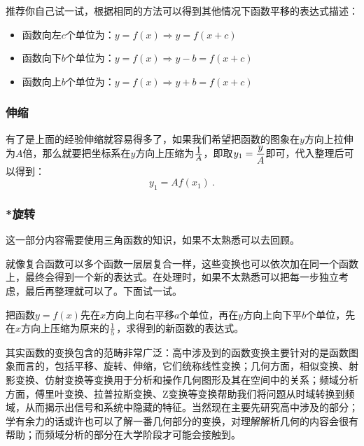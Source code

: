 推荐你自己试一试，根据相同的方法可以得到其他情况下函数平移的表达式描述：
\begin{itemize}
\item 函数向左$c$个单位为：$y=f(x)\Rightarrow y=f(x+c)$
\item 函数向下$b$个单位为：$y=f(x)\Rightarrow y-b=f(x+c)$
\item 函数向上$b$个单位为：$y=f(x)\Rightarrow y+b=f(x+c)$



\end{itemize}






\subsubsection{伸缩}

有了是上面的经验伸缩就容易得多了，如果我们希望把函数的图象在$y$方向上拉伸为$A$倍，那么就要把坐标系在$y$方向上压缩为$\displaystyle 1\over A$，即取$\displaystyle y_1={y\over A}$即可，代入整理后可以得到：
\begin{equation}
y_1=Af(x_1)~.
\end{equation}

\subsubsection{*旋转}

这一部分内容需要使用三角函数的知识，如果不太熟悉可以去回顾。

就像复合函数可以多个函数一层层复合一样，这些变换也可以依次加在同一个函数上，最终会得到一个新的表达式。在处理时，如果不太熟悉可以把每一步独立考虑，最后再整理就可以了。下面试一试。
\begin{exercise}{把函数$y=f(x)$先在$x$方向上向右平移$a$个单位，再在$y$方向上向下平$b$个单位，先在$x$方向上压缩为原来的$1\over5$，求得到的新函数的表达式。}

\end{exercise}



其实函数的变换包含的范畴非常广泛：高中涉及到的函数变换主要针对的是函数图象而言的，包括平移、旋转、伸缩，它们统称线性变换；几何方面，相似变换、射影变换、仿射变换等变换用于分析和操作几何图形及其在空间中的关系；频域分析方面，傅里叶变换、拉普拉斯变换、Z变换等变换帮助我们将问题从时域转换到频域，从而揭示出信号和系统中隐藏的特征。当然现在主要先研究高中涉及的部分；学有余力的话或许也可以了解一番几何部分的变换，对理解解析几何的内容会很有帮助；而频域分析的部分在大学阶段才可能会接触到。

